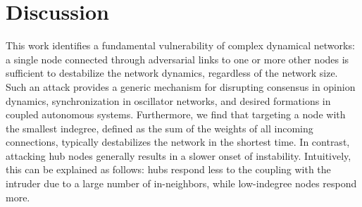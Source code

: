 \documentclass[%
 reprint,
 amsmath,amssymb,
 aip,
]{revtex4-2}
\theoremstyle{italichead}
\theoremstyle{definition}
\begin{document}
{\section{Discussion} \label{sec:conclusions}


 
 This work identifies a fundamental vulnerability of complex dynamical networks: a single node connected through adversarial links to one or more other nodes is sufficient to destabilize the network dynamics, regardless of the network size. Such an attack provides a generic mechanism for disrupting consensus in opinion dynamics, synchronization in oscillator networks, and desired formations in coupled autonomous systems. Furthermore, we find that targeting a node with the smallest indegree, {defined as the sum of the weights of all incoming connections}, typically destabilizes the network in the shortest time. In contrast, attacking hub nodes generally results in a slower onset of instability. Intuitively, this can be explained as follows: hubs respond less to the coupling with the intruder due to a large number of in-neighbors, while low-indegree nodes respond more.

 

}
\end{document}
